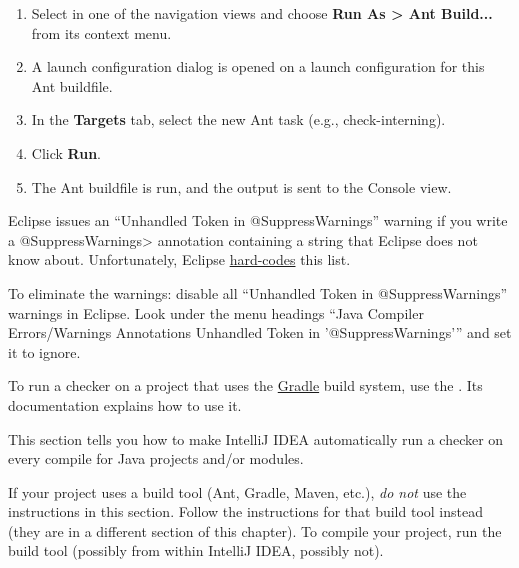 \begin{enumerate}

\item
  Select  in one of the navigation views and choose
  {\bf Run As \textgreater{} Ant Build...} from its context menu.

\item
  A launch configuration dialog is opened on a launch configuration
  for this Ant buildfile.

\item
  In the {\bf Targets} tab, select the new Ant task (e.g., check-interning).

\item
  Click {\bf Run}.

\item
  The Ant buildfile is run, and the output is sent to the Console view.

\end{enumerate}



Eclipse issues an ``Unhandled Token in @SuppressWarnings'' warning if you
write a \<@SuppressWarnings> annotation containing a string that Eclipse does not
know about.  Unfortunately, Eclipse
\href{https://bugs.eclipse.org/bugs/show_bug.cgi?id=122475}{hard-codes}
this list.

To eliminate the warnings:
disable all ``Unhandled Token in @SuppressWarnings'' warnings in Eclipse.
Look under the menu headings
``Java \rightarrowsym{} Compiler \rightarrowsym{} Errors/Warnings \rightarrowsym{}
Annotations \rightarrowsym{} Unhandled Token in '@SuppressWarnings'{}''
and set it to ignore.



To run a checker
on a project that uses the \href{https://gradle.org/}{Gradle} build system,
use the
.  Its documentation explains how to use it.




This section tells you how to make IntelliJ IDEA automatically run a
checker on every compile for Java projects and/or modules.

If your project uses a build tool (Ant, Gradle, Maven, etc.), \emph{do not}
use the instructions in this section.
Follow the instructions for that build tool instead (they are in
a different section of this chapter).  To compile your project, run the
build tool (possibly from within IntelliJ IDEA, possibly not).


